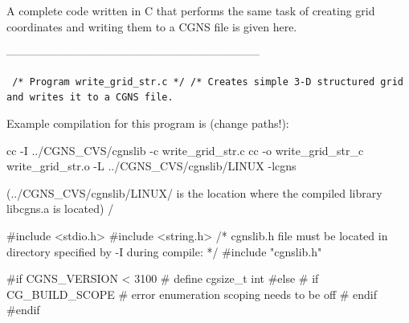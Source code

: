 \documentclass[12pt]{article}
\begin{document}
A complete code written in C that performs the same task of
creating grid coordinates and writing them to a CGNS file is given here.

--------------------------------------------------------------------

{\tt
\noindent /*   Program write\_grid\_str.c    */
\newline /*
\newline Creates simple 3-D structured grid and writes it to a
\newline CGNS file.

\noindent Example compilation for this program is (change paths!):

\noindent cc -I ../CGNS\_CVS/cgnslib -c write\_grid\_str.c
\newline cc -o write\_grid\_str\_c write\_grid\_str.o -L ../CGNS\_CVS/cgnslib/LINUX -lcgns

\noindent (../CGNS\_CVS/cgnslib/LINUX/ is the location where the compiled
\noindent library libcgns.a is located)
\newline */

\noindent \#include <stdio.h>
\newline \#include <string.h>
\newline /* cgnslib.h file must be located in directory specified by -I during compile: */
\newline \#include "cgnslib.h"

\noindent \#if CGNS\_VERSION < 3100
\newline \# define cgsize\_t int
\newline \#else
\newline \# if CG\_BUILD\_SCOPE
\newline \#  error enumeration scoping needs to be off
\newline \# endif
\newline \#endif

}
\end{document}
